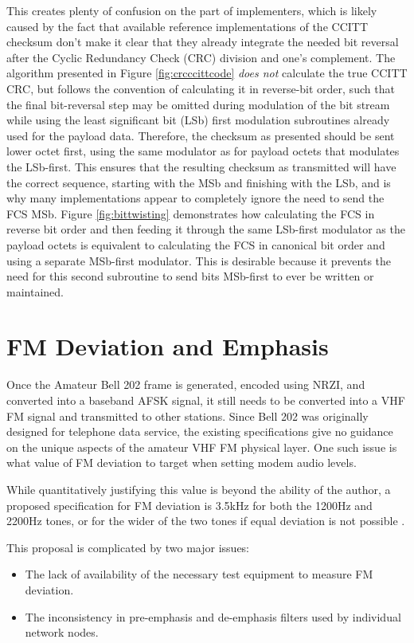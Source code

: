 This creates plenty of confusion on the part of implementers, 
which is likely caused by the fact that 
available reference implementations of the CCITT checksum don't
make it clear that they already integrate the needed bit reversal 
after the Cyclic Redundancy Check (CRC) division and one's complement.
The algorithm presented in Figure \ref{fig:crcccittcode} 
\emph{does not} calculate the true CCITT CRC, but
follows the convention of
calculating it in reverse-bit order, such that the final bit-reversal step 
may be omitted during modulation of the bit stream while using the
least significant bit (LSb) first
modulation subroutines already used for the payload data.
Therefore, the checksum as presented should be sent lower octet first, 
using the same modulator as for payload octets that modulates the 
LSb-first.
This ensures that the resulting checksum as transmitted will have the 
correct sequence, starting with the MSb and finishing with the LSb,
and is why many implementations appear to completely ignore the
need to send the FCS MSb.
Figure \ref{fig:bittwisting} demonstrates how
calculating the FCS in reverse bit order and then feeding it through
the same LSb-first modulator as the payload octets
is equivalent to calculating the FCS in canonical bit order and
using a separate MSb-first modulator.
This is desirable because it prevents the need for this second
subroutine to send bits MSb-first to ever be written or maintained.

\section{FM Deviation and Emphasis}

Once the Amateur Bell 202 frame is generated, encoded using NRZI, and converted into
a baseband AFSK signal, it still needs to be converted into a VHF FM signal
and transmitted to other stations. 
Since Bell 202 was originally designed for telephone data service, 
the existing specifications give no guidance on the unique 
aspects of the amateur VHF FM physical layer. 
One such issue is what value of
FM deviation to target when setting modem audio levels.

While quantitatively justifying this value is beyond the ability of the
author, a proposed specification for FM deviation is 3.5kHz for both the
1200Hz and 2200Hz tones, or for the wider of the two tones if equal
deviation is not possible \cite{millerinterview}.

This proposal is complicated by two major issues: 
\begin{itemize}
	\item The lack of availability of the necessary 
		test equipment to measure FM deviation.
	\item The inconsistency in pre-emphasis and de-emphasis filters
		used by individual network nodes.
\end{itemize}

